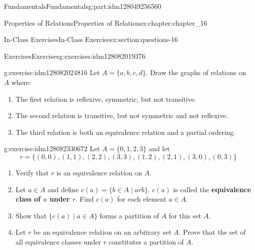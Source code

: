 \documentclass[oneside,10pt,]{book}
\newcommand{\terminology}[1]{\textbf{#1}}
\numberwithin{equation}{section}
\begin{document}
\begin{partptx}{Fundamentals}{}{Fundamentals}{}{}{g:part:idm128049256560}
\begin{chapterptx}{Properties of Relations}{}{Properties of Relations}{}{}{x:chapter:chapter_16}
\typeout{************************************************}
%
\begin{sectionptx}{In-Class Exercises}{}{In-Class Exercises}{}{}{x:section:questions-16}
%
%
%
\typeout{************************************************}
\typeout{************************************************}
%
\begin{exercises-subsection}{Exercises}{}{Exercises}{}{}{g:exercises:idm128082019376}
\par\medskip\noindent%
%
\begin{exercisegroup}
\begin{divisionexerciseeg}{1}{}{}{g:exercise:idm128082024816}%
Let \(A = \{a, b, c, d\}\). Draw the graphs of relations on \(A\) where:%
\begin{enumerate}[label=(\alph*)]
\item{}The first relation is  reflexive, symmetric, but not transitive.%
\item{}The second relation is transitive, but not symmetric and not reflexive.%
\item{}The third relation is both an equivalence relation and a partial ordering.%
\end{enumerate}
%
\end{divisionexerciseeg}%
\begin{divisionexerciseeg}{2}{}{}{g:exercise:idm128082330672}%
Let \(A = \{0, 1, 2, 3\}\) and let%
\begin{equation*}
r = \{(0, 0), (1, 1), (2, 2), (3, 3), (1, 2), (2, 1), (3, 0), (0, 3)\}
\end{equation*}
%
\begin{enumerate}[label=(\alph*)]
\item{}Verify that \(r\) is an equivalence relation on \(A\).%
\item{}Let \(a \in A\) and define \(c(a) = \{b \in A \mid a rb\}\). \label{g:notation:idm128072735488} \(c(a)\) is called the \terminology{equivalence class of \(a\) under \(r\)}. Find \(c(a)\) for each element \(a \in A\).%
\item{}Show that \(\{c(a) \mid  a \in A\}\) forms a partition of \(A\) for this set \(A\).%
\item{}Let \(r\) be an equivalence relation on an arbitrary set \(A\). Prove that the set of all equivalence classes under \(r\) constitutes a partition of \(A\).%
\end{enumerate}
%
\end{divisionexerciseeg}%

\end{exercisegroup}
\end{exercises-subsection}
\end{sectionptx}
\end{chapterptx}
\end{partptx}
\end{document}
